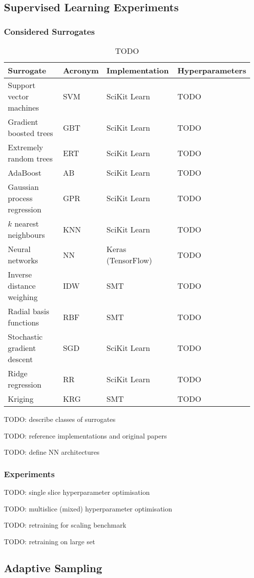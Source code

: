 \subsection{Supervised Learning Experiments}
\label{sec:supervised}

\subsubsection{Considered Surrogates}

\begin{table}[h]
	\centering
	\begin{tabular}{llll}
	\toprule
	Surrogate & Acronym & Implementation & Hyperparameters \\
	\midrule
	Support vector machines	& SVM & SciKit Learn & TODO \\
	Gradient boosted trees	& GBT & SciKit Learn & TODO \\
	Extremely random trees	& ERT & SciKit Learn & TODO \\
	AdaBoost	& AB & SciKit Learn & TODO \\
	Gaussian process regression	& GPR & SciKit Learn & TODO \\
	$k$ nearest neighbours	& KNN & SciKit Learn & TODO \\
	Neural networks	& NN & Keras (TensorFlow) & TODO \\
	Inverse distance weighing & IDW & SMT & TODO \\
	Radial basis functions & RBF & SMT & TODO \\
	Stochastic gradient descent & SGD & SciKit Learn & TODO \\
	Ridge regression & RR & SciKit Learn & TODO \\
	Kriging & KRG & SMT & TODO \\
	\bottomrule
	\end{tabular}
	\caption{TODO}
	\label{tbl:surrogates}
\end{table}

TODO: describe classes of surrogates

TODO: reference implementations and original papers

TODO: define NN architectures


\subsubsection{Experiments}

TODO: single slice hyperparameter optimisation

TODO: multislice (mixed) hyperparameter optimisation

TODO: retraining for scaling benchmark

TODO: retraining on large set

\subsection{Adaptive Sampling}
\label{sec:adaptive}

